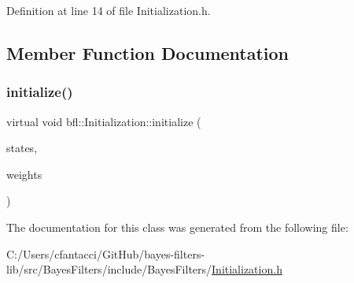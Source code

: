 Definition at line 14 of file Initialization.\+h.



\subsection{Member Function Documentation}
\mbox{\label{classbfl_1_1Initialization_aabd4858e78115b904de19d7282f0aad7}} 
\subsubsection{\texorpdfstring{initialize()}{initialize()}}
{\footnotesize\ttfamily virtual void bfl\+::\+Initialization\+::initialize (\begin{DoxyParamCaption}\item[{Eigen\+::\+Ref$<$ Eigen\+::\+Matrix\+Xf $>$}]{states,  }\item[{Eigen\+::\+Ref$<$ Eigen\+::\+Vector\+Xf $>$}]{weights }\end{DoxyParamCaption})\hspace{0.3cm}{\ttfamily [pure virtual]}}



The documentation for this class was generated from the following file\+:\begin{DoxyCompactItemize}
\item 
C\+:/\+Users/cfantacci/\+Git\+Hub/bayes-\/filters-\/lib/src/\+Bayes\+Filters/include/\+Bayes\+Filters/\mbox{\hyperlink{Initialization_8h}{Initialization.\+h}}\end{DoxyCompactItemize}
